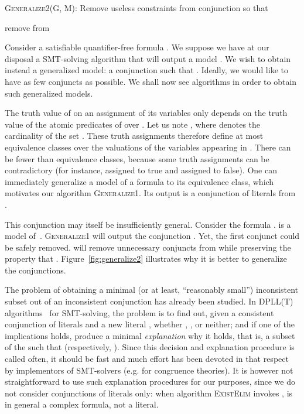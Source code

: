\begin{algorithm}
\caption{\textsc{Generalize2}(G, M): Remove useless constraints from conjunction  so that }
\begin{algorithmic}
     \STATE remove  from 
  \ENDIF
\ENDFOR
{}
\end{algorithmic}
\end{algorithm}

Consider a satisfiable quantifier-free formula . We suppose we have at our disposal a SMT-solving algorithm that will output a model . We wish to obtain instead a generalized model: a conjunction  such that . Ideally, we would like  to have as few conjuncts as possible. We shall now see algorithms in order to obtain such generalized models.

The truth value of  on an assignment  of its variables only depends on the truth value of the atomic predicates of  over . Let us note , where  denotes the cardinality of the set . These truth assignments therefore define at most  equivalence classes over the valuations of the variables appearing in . There can be fewer than  equivalence classes, because some truth assignments can be contradictory (for instance,  assigned to \textsf{true} and  assigned to \textsf{false}). One can immediately generalize a model of a formula to its equivalence class, which motivates our algorithm \textsc{Generalize1}. Its output is a conjunction of literals from .

This conjunction may itself be insufficiently general. Consider the formula .  is a model of~. \textsc{Generalize1} will output the conjunction . Yet, the first conjunct could be safely removed.  will remove unnecessary conjuncts from  while preserving the property that . Figure~\ref{fig:generalize2} illustrates why it is better to generalize the conjunctions.

The problem of obtaining a minimal (or at least, ``reasonably small'') inconsistent subset out of an inconsistent conjunction has already been studied. In DPLL(T) algorithms~\cite{Ganzingeretal2004CAV} for SMT-solving, the problem is to find out, given a consistent conjunction of literals  and a new literal , whether , , or neither; and if one of the implications holds, produce a minimal \emph{explanation} why it holds, that is, a subset  of the  such that  (respectively, ). Since this decision and explanation procedure is called often, it should be fast and much effort has been devoted in that respect by implementors of SMT-solvers (e.g. \cite{NieuwenhuisOliverasIC2007} for congruence theories). It is however not straightforward to use such explanation procedures for our purposes, since we do not consider conjunctions of literals only: when algorithm \textsc{ExistElim} invokes ,  is in general a complex formula, not a literal.

